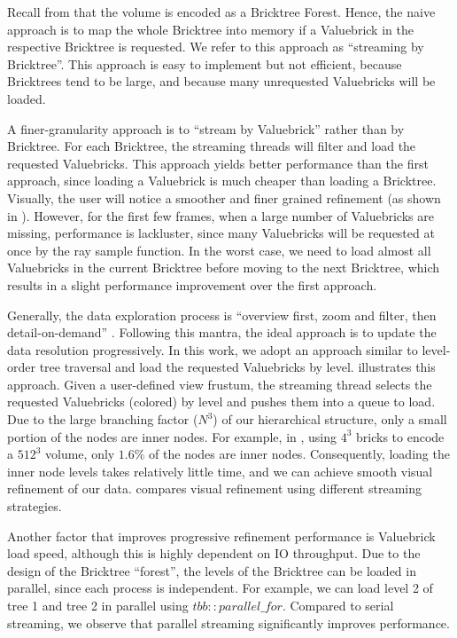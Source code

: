 Recall from  that the volume is encoded as a Bricktree Forest. 
Hence, the naive approach is to map the whole Bricktree into memory if a Valuebrick in the
respective Bricktree is requested. We refer to this approach as ``streaming by Bricktree''. 
This approach is easy to implement but not efficient, because Bricktrees tend to be large, 
and because many unrequested Valuebricks will be loaded. 



A finer-granularity approach is to ``stream by Valuebrick'' rather than by Bricktree. For each
Bricktree, the streaming threads will filter and load the requested Valuebricks. 
This approach yields better performance than the first approach, since loading a Valuebrick
is much cheaper than loading a Bricktree. Visually, the user will notice a smoother and finer grained refinement (as shown in ).
However, for the first few frames, when a large number of Valuebricks are missing, performance is lackluster, since many Valuebricks will be requested at once by the ray sample function.
In the worst case, we need to load almost all Valuebricks
in the current Bricktree before moving to the next Bricktree, which results in a slight performance improvement over the first approach.



Generally, the data exploration process is ``overview first, zoom and filter, then detail-on-demand''
\cite{ferster2012interactive,wang2018association}. 
Following this mantra, 
the ideal approach is to update the data resolution progressively. 
In this work, we adopt an approach similar
to level-order tree traversal and load the requested Valuebricks by level. 
illustrates this approach. Given a user-defined view frustum, the streaming thread
selects the requested Valuebricks (colored) by level and pushes them into a queue to load. Due to
the large branching factor ($N^3$) of our hierarchical structure, only a small portion of the
nodes are inner nodes. For example, in , using $4^3$ bricks to encode a
$512^3$ volume, only $1.6\%$ of the nodes are inner nodes. Consequently, loading the inner node levels
takes relatively little time, and we can achieve smooth visual refinement of our data. 
 compares visual refinement using different streaming strategies.




Another factor that improves progressive refinement performance is Valuebrick load speed,
although this is highly dependent on IO throughput. Due to the design of the Bricktree ``forest'', 
the levels of the Bricktree can be loaded in parallel, since each process is independent.
For example, we can load level 2 of tree 1 and tree 2 in parallel using $tbb::parallel\_for$. 
Compared to serial streaming, we observe that parallel streaming significantly improves performance. 


